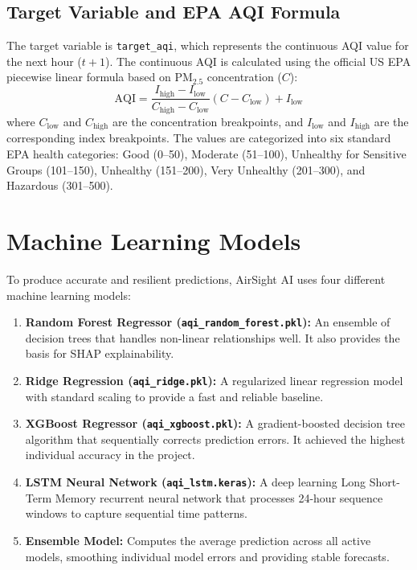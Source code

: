 \documentclass[12pt,a4paper]{article}
\begin{document}
\subsection{Target Variable and EPA AQI Formula}
The target variable is \texttt{target\_aqi}, which represents the continuous AQI value for the next hour ($t+1$). The continuous AQI is calculated using the official US EPA piecewise linear formula based on $\text{PM}_{2.5}$ concentration ($C$):
\begin{equation}
\text{AQI} = \frac{I_{\text{high}} - I_{\text{low}}}{C_{\text{high}} - C_{\text{low}}} (C - C_{\text{low}}) + I_{\text{low}}
\end{equation}
where $C_{\text{low}}$ and $C_{\text{high}}$ are the concentration breakpoints, and $I_{\text{low}}$ and $I_{\text{high}}$ are the corresponding index breakpoints. The values are categorized into six standard EPA health categories: Good (0--50), Moderate (51--100), Unhealthy for Sensitive Groups (101--150), Unhealthy (151--200), Very Unhealthy (201--300), and Hazardous (301--500).

\section{Machine Learning Models}

To produce accurate and resilient predictions, AirSight AI uses four different machine learning models:

\begin{enumerate}
    \item \textbf{Random Forest Regressor (\texttt{aqi\_random\_forest.pkl}):} An ensemble of decision trees that handles non-linear relationships well. It also provides the basis for SHAP explainability.
    \item \textbf{Ridge Regression (\texttt{aqi\_ridge.pkl}):} A regularized linear regression model with standard scaling to provide a fast and reliable baseline.
    \item \textbf{XGBoost Regressor (\texttt{aqi\_xgboost.pkl}):} A gradient-boosted decision tree algorithm that sequentially corrects prediction errors. It achieved the highest individual accuracy in the project.
    \item \textbf{LSTM Neural Network (\texttt{aqi\_lstm.keras}):} A deep learning Long Short-Term Memory recurrent neural network that processes 24-hour sequence windows to capture sequential time patterns.
    \item \textbf{Ensemble Model:} Computes the average prediction across all active models, smoothing individual model errors and providing stable forecasts.
\end{enumerate}
\end{document}
